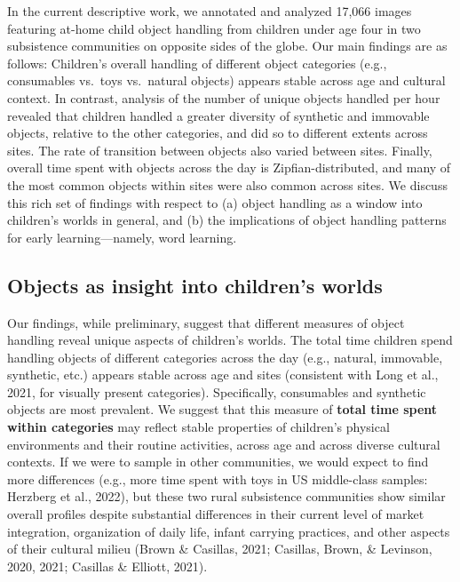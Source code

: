 \documentclass[10pt, letterpaper]{article}
\begin{document}
In the current descriptive work, we annotated and analyzed 17,066 images
featuring at-home child object handling from children under age four in
two subsistence communities on opposite sides of the globe. Our main
findings are as follows: Children's overall handling of different object
categories (e.g., consumables vs.~toys vs.~natural objects) appears
stable across age and cultural context. In contrast, analysis of the
number of unique objects handled per hour revealed that children handled
a greater diversity of synthetic and immovable objects, relative to the
other categories, and did so to different extents across sites. The rate
of transition between objects also varied between sites. Finally,
overall time spent with objects across the day is Zipfian-distributed,
and many of the most common objects within sites were also common across
sites. We discuss this rich set of findings with respect to (a) object
handling as a window into children's worlds in general, and (b) the
implications of object handling patterns for early learning---namely,
word learning.

\hypertarget{objects-as-insight-into-childrens-worlds}{%
\subsection{Objects as insight into children's
worlds}\label{objects-as-insight-into-childrens-worlds}}

Our findings, while preliminary, suggest that different measures of
object handling reveal unique aspects of children's worlds. The total
time children spend handling objects of different categories across the
day (e.g., natural, immovable, synthetic, etc.) appears stable across
age and sites (consistent with Long et al., 2021, for visually present
categories). Specifically, consumables and synthetic objects are most
prevalent. We suggest that this measure of \textbf{total time spent
within categories} may reflect stable properties of children's physical
environments and their routine activities, across age and across diverse
cultural contexts. If we were to sample in other communities, we would
expect to find more differences (e.g., more time spent with toys in US
middle-class samples: Herzberg et al., 2022), but these two rural
subsistence communities show similar overall profiles despite
substantial differences in their current level of market integration,
organization of daily life, infant carrying practices, and other aspects
of their cultural milieu (Brown \& Casillas, 2021; Casillas, Brown, \&
Levinson, 2020, 2021; Casillas \& Elliott, 2021).
\end{document}
